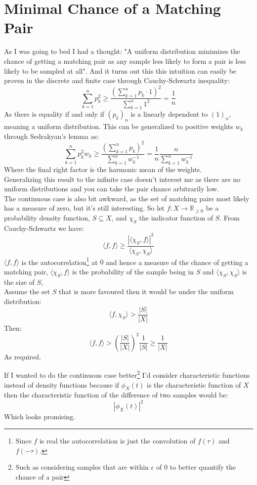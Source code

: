 
\section{Minimal Chance of a Matching Pair}
As I was going to bed I had a thought:
"A uniform distribution minimizes the chance of getting a matching pair as any sample less likely to form a pair is less likely to be sampled at all".  
And it turns out this this intuition can easily be proven in the discrete and finite case through Cauchy-Schwartz inequality:
\[\sum_{k=1}^np_k^2\geq\frac{\left(\sum_{k=1}^np_k\cdot1\right)^2}{\sum_{k=1}^n1^2}=\frac{1}{n}\]
As there is equality if and only if $(p_k)_n$ is a linearly dependent to $(1)_n$,
meaning a uniform distribution.
This can be generalized to positive weights $w_k$ through Sedrakyan's lemma as:
\[\sum_{k=1}^np_k^2w_k \geq \frac{\left(\sum_{k=1}^np_k\right)^2}{\sum_{k=1}^nw_k^{-1}}=\frac{1}{n}\frac{n}{\sum_{k=1}^nw_k^{-1}}\]
Where the final right factor is the harmonic mean of the weights.
\\

Generalizing this result to the infinite case doesn't interest me as there are no uniform distributions and you can take the pair chance arbitrarily low.
\\

The continuous case is also bit awkward,
as the set of matching pairs most likely has a measure of zero,
but it's still interesting.
So let $f:X\rightarrow\mathbb{R}_{\geq0}$ be a probability density function, 
$S\subseteq X$,
and $\chi_S$ the indicator function of $S$.
From Cauchy-Schwartz we have:
\[\langle f,f\rangle \geq \frac{|\langle\chi_S,f\rangle|^2}{\langle\chi_S,\chi_S\rangle}\]
$\langle f,f\rangle$ is the autocorrelation\footnote{
Since $f$ is real the autocorrelation is just the convolution of $f(\tau)$ and $f(-\tau)$.}
at $0$ and hence a measure of the chance of getting a matching pair,
$\langle \chi_S,f\rangle$ is the probability of the sample being in $S$ and $\langle \chi_S,\chi_S\rangle$ is the size of $S$,
\\

Assume the set $S$ that is more favoured then it would be under the uniform distribution:
\[\langle f,\chi_S\rangle > \frac{|S|}{|X|}\]
Then:
\[\langle f,f\rangle > \left(\frac{|S|}{|X|}\right)^2\frac{1}{|S|} \geq \frac{1}{|X|}\]
As required.

If I wanted to do the continuous case better\footnote{
Such as considering samples that are within $\epsilon$ of $0$ to better quantify the chance of a pair} 
I'd consider characteristic functions instead of density functions because if $\phi_X(t)$ is the characteristic function of $X$ then the characteristic function of the difference of two samples would be:
\[|\phi_X(t)|^2\]
Which looks promising.
